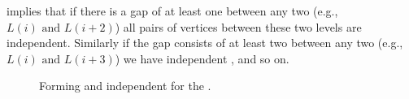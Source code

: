  implies that if there is a gap of at least
one \level between any two \levels (e.g., $L(i) \mbox{ and } L(i+2)$) all
pairs of vertices between these two levels are \DONE independent. Similarly
if the gap consists of at least two \levels between any two
\levels (e.g., $L(i) \mbox{ and } L(i+3)$) we have \DTWO independent
\levels, and so on.
 \begin{figure}[tbp]
 	\centering
 	\hspace{2.5em}
 	\caption{Forming \DONE and \DTWO independent \levelGroups for the \stex.}
 	\label{fig:2d-7pt_d1_d2}
 \end{figure}
 
